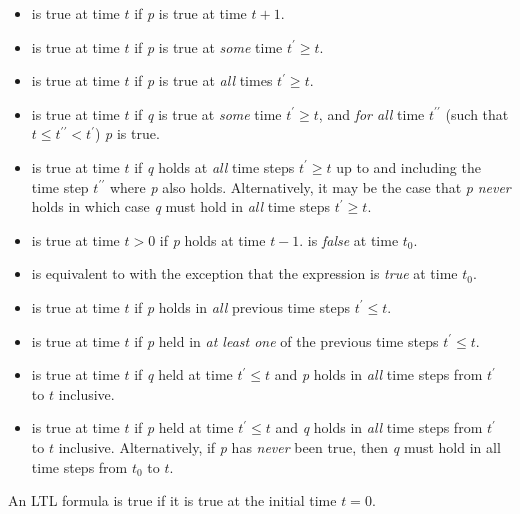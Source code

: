 \begin{itemize}
  \item {}
        is true at time $t$ if \textit{p} is true at time $t+1$.
  \item {}
        is true at time $t$ if \textit{p} is true at \emph{some} time
        $t^\prime \ge t$.
  \item {}
        is true at time $t$ if \textit{p} is true at \emph{all} times
        $t^\prime \ge t$.
  \item {}
        is true at time $t$ if \textit{q} is true at \emph{some} time
        $t^\prime \ge t$, and \emph{for all} time $t^{\prime\prime}$
        (such that $t \le t^{\prime\prime} < t^\prime$) \textit{p} is
        true.
  \item {}
        is true at time $t$ if \textit{q} holds at \emph{all} time steps $t^\prime
        \geq t$ up to and including the time step $t^{\prime\prime}$
        where \textit{p} also holds. Alternatively, it may be the case that \textit{p}
        \emph{never} holds in which case \textit{q} must hold in \emph{all} time
        steps $t^\prime \geq t$.
  \item {} is true at time $t > 0$ if \textit{p} holds
        at time $t - 1$.  is \emph{false} at time $t_0$.
  \item {} is equivalent to 
        with the exception that the expression is \emph{true} at time $t_0$.
  \item {} is true at time $t$ if \textit{p} holds in \emph{all}
        previous time steps $t^\prime \leq t$.
  \item {} is true at time $t$ if \textit{p} held in \emph{at least one}
        of the previous time steps $t^\prime \leq t$.
  \item {} is true at time $t$ if \textit{q} held at time
        $t^\prime \leq t$ and \textit{p} holds in \emph{all} time steps from $t^\prime$ to
        $t$ inclusive.
  \item {} is true at time $t$ if \textit{p} held at time
        $t^\prime \leq t$ and \textit{q} holds in \emph{all} time steps from $t^\prime$ to
        $t$ inclusive. Alternatively, if \textit{p} has \emph{never} been true, then \textit{q} must
        hold in all time steps from $t_0$ to $t$.
\end{itemize}
An LTL formula is true if it is true at the initial time $t = 0$.

